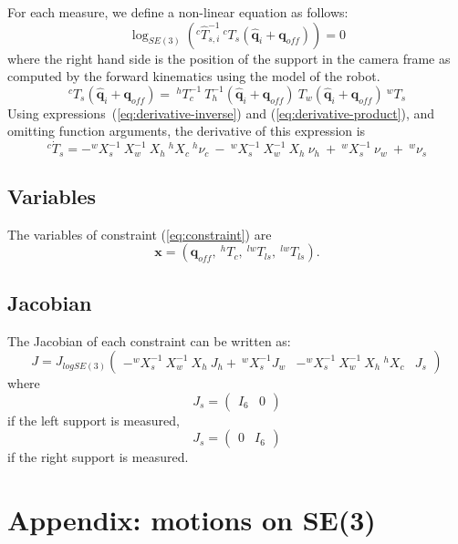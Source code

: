 \documentclass {article}
\newcommand\conf{\mathbf{q}}
\newcommand\confoffset{\mathbf{q}_{off}}
\newcommand\transf{T}
\newcommand\x{\mathbf{x}}
\begin{document}
For each measure, we define a non-linear equation as follows:
\begin{equation}\label{eq:constraint}
\log_{SE(3)}\left(^{c}\hat{\transf}_{s,i}^{-1}\ ^{c}{\transf}_{s} (\hat{\conf}_{i} + \confoffset)\right) = 0
\end{equation}
where the right hand side is the position of the support in the camera frame as
computed by the forward kinematics using the model of the robot.
$$
^{c}{\transf}_{s} (\hat{\conf}_{i} + \confoffset) =\ ^{h}\transf_{c}^{-1}\ \transf_{h}^{-1}(\hat{\conf}_{i} + \confoffset)\ \transf_{w} (\hat{\conf}_{i} + \confoffset)\ ^{w}\transf_{s}
$$
Using expressions~(\ref{eq:derivative-inverse}) and (\ref{eq:derivative-product}), and omitting function arguments, the derivative of this expression is
$$
^{c}{\dot{\transf}}_{s} = -^{w}X_{s}^{-1}\ X_{w}^{-1}\ X_{h}\ ^{h}X_{c}\ ^{h}\nu_{c}\ -\ 
^{w}X_{s}^{-1}\ X_{w}^{-1}\ X_{h}\ \nu_{h}\ +\ ^{w}X_{s}^{-1}\ \nu_{w}\ +\ ^{w}\nu_{s}
$$

\subsection{Variables}

The variables of constraint (\ref{eq:constraint}) are
$$
\x = \left(\confoffset,\ ^{h}\transf_{c},\ ^{lw}\transf_{ls},\ ^{lw}\transf_{ls}\right).
$$

\subsection{Jacobian}

The Jacobian of each constraint can be written as:
$$
J = J_{logSE(3)}
\left(\begin{array}{cccc}
  -^{w}X_{s}^{-1}\ X_{w}^{-1}\ X_{h}\ J_{h} %
  +\ ^{w}X_{s}^{-1} J_{w}%
  & -^{w}X_{s}^{-1}\ X_{w}^{-1}\ X_{h}\ ^{h}X_{c}
  & J_{s}
\end{array}
\right)
$$
where
$$
J_{s} =
\left(\begin{array}{cc}
I_6 & 0
\end{array}\right)
$$
if the left support is measured,
$$
J_{s} =
\left(\begin{array}{cc}
  0 & I_6
\end{array}\right)
$$
if the right support is measured.

\section {Appendix: motions on SE(3)}
\end{document}
